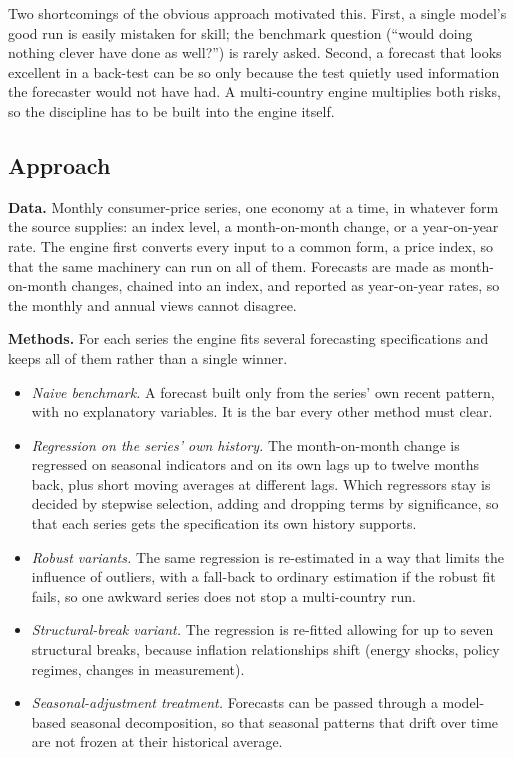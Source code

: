 \documentclass[
  british,
  a4paper,
]{article}
\providecommand{\tightlist}{%
  \setlength{\itemsep}{0pt}\setlength{\parskip}{0pt}}
\begin{document}
Two shortcomings of the obvious approach motivated this. First, a single
model's good run is easily mistaken for skill; the benchmark question
(``would doing nothing clever have done as well?'') is rarely asked.
Second, a forecast that looks excellent in a back-test can be so only
because the test quietly used information the forecaster would not have
had. A multi-country engine multiplies both risks, so the discipline has
to be built into the engine itself.

\subsection{Approach}\label{approach}

\textbf{Data.} Monthly consumer-price series, one economy at a time, in
whatever form the source supplies: an index level, a month-on-month
change, or a year-on-year rate. The engine first converts every input to
a common form, a price index, so that the same machinery can run on all
of them. Forecasts are made as month-on-month changes, chained into an
index, and reported as year-on-year rates, so the monthly and annual
views cannot disagree.

\textbf{Methods.} For each series the engine fits several forecasting
specifications and keeps all of them rather than a single winner.

\begin{itemize}
\tightlist
\item
  \emph{Naive benchmark.} A forecast built only from the series' own
  recent pattern, with no explanatory variables. It is the bar every
  other method must clear.
\item
  \emph{Regression on the series' own history.} The month-on-month
  change is regressed on seasonal indicators and on its own lags up to
  twelve months back, plus short moving averages at different lags.
  Which regressors stay is decided by stepwise selection, adding and
  dropping terms by significance, so that each series gets the
  specification its own history supports.
\item
  \emph{Robust variants.} The same regression is re-estimated in a way
  that limits the influence of outliers, with a fall-back to ordinary
  estimation if the robust fit fails, so one awkward series does not
  stop a multi-country run.
\item
  \emph{Structural-break variant.} The regression is re-fitted allowing
  for up to seven structural breaks, because inflation relationships
  shift (energy shocks, policy regimes, changes in measurement).
\item
  \emph{Seasonal-adjustment treatment.} Forecasts can be passed through
  a model-based seasonal decomposition, so that seasonal patterns that
  drift over time are not frozen at their historical average.
\end{itemize}
\end{document}
